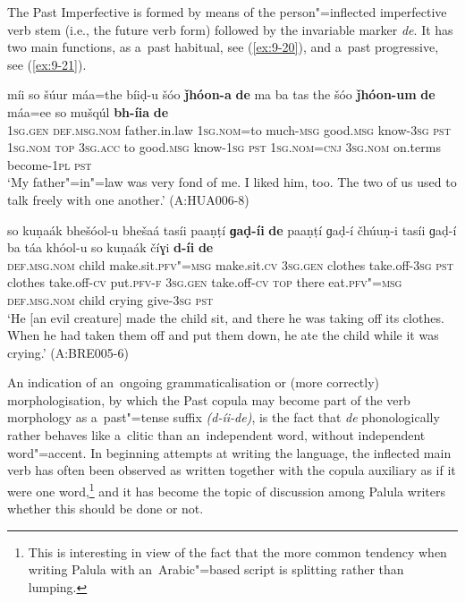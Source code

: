 The Past Imperfective is formed by means of the person"=inflected imperfective verb stem (i.e., the future verb form) followed by the invariable marker \textit{de}. It has two main functions, as a~past habitual, see (\ref{ex:9-20}), and a~past progressive, see (\ref{ex:9-21}).

\ea
\label{ex:9-20}
\gll míi so šúur máa=the bíiḍ-u šóo \textbf{ǰhóon-a} \textbf{de} ma ba tas the šóo \textbf{ǰhóon-um} \textbf{de} máa=ee so mušqúl \textbf{bh-íia} \textbf{de}\\
\textsc{1sg.gen} \textsc{def.msg.nom} father.in.law \textsc{1sg.nom=}to much-\textsc{msg} good.\textsc{msg} know-\textsc{3sg} \textsc{pst} \textsc{1sg.nom} \textsc{top} \textsc{3sg.acc}  to good.\textsc{msg} know-\textsc{1sg } \textsc{pst } \textsc{1sg.nom=cnj}  \textsc{3sg.nom} on.terms become-\textsc{1pl} \textsc{pst} \\
\glt `My father"=in"=law was very fond of me. I liked him, too. The two of us used to talk freely with one another.' (A:HUA006-8)

\ex
\label{ex:9-21}
\gll so kuṇaák bhešóol-u bhešaá tasíi paaṇṭí \textbf{ɡaḍ-íi} \textbf{de} paaṇṭí ɡaḍ-í čhúuṇ-i tasíi ɡaḍ-í ba táa khóol-u so kuṇaák číɣi \textbf{d-íi} \textbf{de} \\
\textsc{def.msg.nom} child make.sit.\textsc{pfv"=msg} make.sit.\textsc{cv} \textsc{3sg.gen}  clothes take.off-\textsc{3sg } \textsc{pst} clothes take.off-\textsc{cv} put.\textsc{pfv-f}  \textsc{3sg.gen} take.off-\textsc{cv} \textsc{top} there eat.\textsc{pfv"=msg}  \textsc{def.msg.nom} child crying give-\textsc{3sg} \textsc{pst} \\
\glt `He [an evil creature] made the child sit, and there he was taking off its clothes. When he had taken them off and put them down, he ate the child while it was crying.' (A:BRE005-6)
\z

An indication of an~ongoing grammaticalisation or (more correctly) morphologisation, by which the Past copula may become part of the verb morphology as a~past"=tense suffix \textit{(d-íi-de)}, is the fact that \textit{de} phonologically rather behaves like a~clitic than an~independent word, without independent word"=accent. In beginning attempts at writing the language, the inflected main verb has often been observed as written together with the copula auxiliary as if it were one word,\footnote{This is interesting in view of the fact that the more common tendency when writing Palula with an~Arabic"=based script is splitting rather than lumping.} and it has become the topic of discussion among Palula writers whether this should be done or not. 


